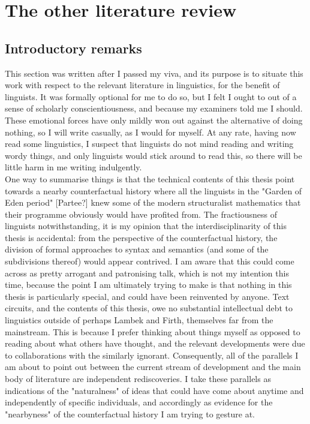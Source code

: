 
\section{The other literature review}

\subsection{Introductory remarks}

This section was written after I passed my viva, and its purpose is to situate this work with respect to the relevant literature in linguistics, for the benefit of linguists. It was formally optional for me to do so, but I felt I ought to out of a sense of scholarly conscientiousness, and because my examiners told me I should. These emotional forces have only mildly won out against the alternative of doing nothing, so I will write casually, as I would for myself. At any rate, having now read some linguistics, I suspect that linguists do not mind reading and writing wordy things, and only linguists would stick around to read this, so there will be little harm in me writing indulgently.\\

One way to summarise things is that the technical contents of this thesis point towards a nearby counterfactual history where all the linguists in the "Garden of Eden period" [Partee?] knew some of the modern structuralist mathematics that their programme obviously would have profited from. The fractiousness of linguists notwithstanding, it is my opinion that the interdisciplinarity of this thesis is accidental: from the perspective of the counterfactual history, the division of formal approaches to syntax and semantics (and some of the subdivisions thereof) would appear contrived. I am aware that this could come across as pretty arrogant and patronising talk, which is not my intention this time, because the point I am ultimately trying to make is that nothing in this thesis is particularly special, and could have been reinvented by anyone. Text circuits, and the contents of this thesis, owe no substantial intellectual debt to linguistics outside of perhaps Lambek and Firth, themselves far from the mainstream. This is because I prefer thinking about things myself as opposed to reading about what others have thought, and the relevant developments were due to collaborations with the similarly ignorant. Consequently, all of the parallels I am about to point out between the current stream of development and the main body of literature are independent rediscoveries. I take these parallels as indications of the "naturalness" of ideas that could have come about anytime and independently of specific individuals, and accordingly as evidence for the "nearbyness" of the counterfactual history I am trying to gesture at.

